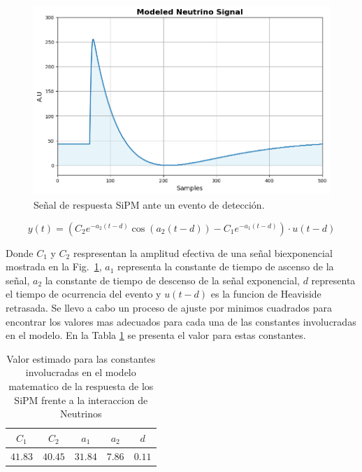 \documentclass[conference]{IEEEtran}
\begin{document}
\begin{figure}[htpb]
    \centerline{\includegraphics[scale=0.35]{modeled_neutrino_signal.png}}
    \caption{Señal de respuesta SiPM ante un evento de detección.}
    \label{modeled_neutrino}
\end{figure}


\begin{equation}
\label{eq_neutrino_time}
y(t) = (C_2  e^{-a_2 (t - d)} \cos(a_2  (t - d)) - C_1 e^{-a_1 (t - d)})\cdot u(t-d)
\end{equation}

Donde $C_1$ y $C_2$ respresentan la amplitud efectiva de una señal biexponencial mostrada en la Fig.~\ref{modeled_neutrino}, $a_1$ representa la constante de tiempo de ascenso de la señal, $a_2$ la constante de tiempo de descenso de la señal exponencial, $d$ representa el tiempo de ocurrencia del evento y $u(t-d)$ es la funcion de Heaviside retrasada. Se llevo a cabo un proceso de ajuste por minimos cuadrados para encontrar los valores mas adecuados para cada una de las constantes involucradas en el modelo. En la Tabla \ref{tab_biexp} se presenta el valor para estas constantes.




\begin{table}[htbp]
\caption{Valor estimado para las constantes involucradas en el modelo matematico de la respuesta de los SiPM frente a la interaccion de Neutrinos}
\begin{center}
\begin{tabular}{|c|c|c|c|c|}
\hline
$C_1$ & $C_2$ & $a_1$ & $a_2$ & $d$ \\
\hline
$41.83$ & $40.45$ & $31.84$ & $7.86$ & $0.11$ \\
\hline
\end{tabular}
\label{tab_biexp}
\end{center}
\end{table}
\end{document}

